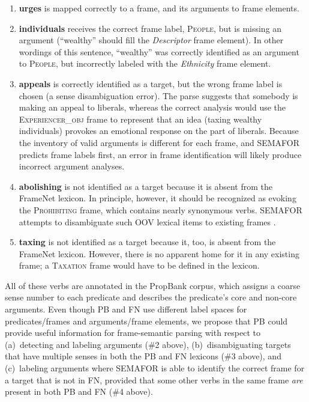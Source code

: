 \documentclass[11pt]{article}
\newcommand{\ensuretext}[1]{#1}
\newcommand{\nssmarker}{\ensuretext{\textcolor{magenta}{\ensuremath{^{\textsc{NS}}_{\textsc{S}}}}}}
\newcommand{\arkcomment}[3]{\ensuretext{\textcolor{#3}{[#1 #2]}}}
\newcommand{\nss}[1]{\arkcomment{\nssmarker}{#1}{magenta}}
\newcommand{\finalversion}[1]{}
\newcommand{\longversion}[1]{} %
\newcommand{\vpred}[1]{\textbf{#1}} %
\newcommand{\fname}[1]{\textsc{#1}} %
\newcommand{\rname}[1]{\textsl{#1}} %
\begin{document}
\begin{enumerate}
  \item \vpred{urges} is mapped correctly to a frame, and its arguments to frame elements.
  \item \vpred{individuals} receives the correct frame label, \fname{People}, but is missing an argument 
  (``wealthy'' should fill the \rname{Descriptor} frame element). In other wordings of this sentence, 
  ``wealthy'' was correctly identified as an argument to \fname{People}, but incorrectly labeled 
  with the \rname{Ethnicity} frame element. 
  \item \vpred{appeals} is correctly identified as a target, but the wrong frame label is chosen 
  (a sense disambiguation error). The parse suggests that somebody is making an appeal to liberals, 
  whereas the correct analysis would use the \fname{Experiencer\_obj} frame to represent that an idea
  (taxing wealthy individuals) provokes an emotional response on the part of liberals. 
  Because the inventory of valid arguments is different for each frame, and SEMAFOR predicts frame labels first, 
  an error in frame identification will likely produce incorrect argument analyses.
  \item \vpred{abolishing} is not identified as a target because it is absent from the FrameNet lexicon. 
  In principle, however, it should be recognized as evoking the \fname{Prohibiting} frame, which contains 
  nearly synonymous verbs. SEMAFOR\finalversion{\nss{the demo version used for the figure?}} attempts to disambiguate such OOV lexical items 
  to existing frames \citep{das-acl2011}.
  \item \vpred{taxing} is not identified as a target because it, too, is absent from the FrameNet lexicon. 
  However, there is no apparent home for it in any existing frame; a \fname{Taxation} frame would have to be defined 
  in the lexicon.\longversion{\footnote{As part of the definition process the frame would be linked to related concepts that already have frames, 
  such as \fname{Government\_institution}, \fname{Imposing\_obligation}, and \fname{Commerce\_collect}.}}
\end{enumerate}

All of these verbs are annotated in the PropBank corpus, which assigns a coarse sense number 
to each predicate and describes the predicate's core and non-core arguments. 
Even though PB and FN use different label spaces for predicates/frames and 
arguments/frame elements, we propose that PB could provide useful information for frame-semantic parsing 
with respect to (a)~detecting and labeling arguments (\#2 above),  
(b)~disambiguating targets that have multiple senses in both the PB and FN lexicons (\#3 above), and
(c)~labeling arguments where SEMAFOR is able to identify the correct frame for a target that is not in FN, 
provided that some other verbs in the same frame \emph{are} present in both PB and FN (\#4 above).
\end{document}
